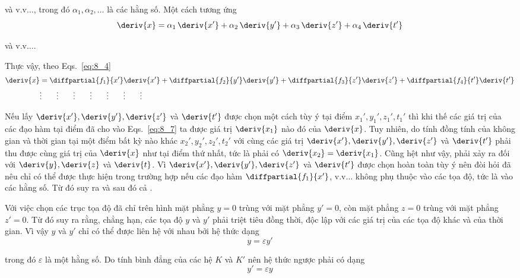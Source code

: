 \noindent
và v.v$\ldots$, trong đó $\alpha_1, \alpha_2, \ldots$ là các hằng số. Một cách tương ứng
\begin{equation}\label{eq:8_6}
	\deriv{x} = \alpha_1\,\deriv{x'} + \alpha_2\,\deriv{y'} + \alpha_3\,\deriv{z'} + \alpha_4\,\deriv{t'}
\end{equation}

\noindent
và v.v$\ldots$.

Thực vậy, theo Eqs.~\eqref{eq:8_4}
\begin{align}
	\deriv{x} &= \diffpartial{f_1}{x'}\deriv{x'} + \diffpartial{f_2}{y'}\deriv{y'} + \diffpartial{f_3}{z'}\deriv{z'} + \diffpartial{f_4}{t'}\deriv{t'}\label{eq:8_7}\\
	&\vdots\quad\quad\vdots\quad\quad\vdots\quad\quad\vdots\quad\quad\vdots\quad\quad\vdots\quad\quad\vdots\nonumber
\end{align}

\noindent
Nếu lấy $\deriv{x'}, \deriv{y'}, \deriv{z'}$ và $\deriv{t'}$ được chọn một cách tùy ý tại điểm $x_1', y_1', z_1', t_1'$ thì khi thế các giá trị của các đạo hàm tại điểm đã cho vào Eqs.~\eqref{eq:8_7} ta được giá trị $\deriv{x_1}$ nào đó của $\deriv{x}$. Tuy nhiên, do tính đồng tính của không gian và thời gian tại một điểm bất kỳ nào khác $x_2', y_2', z_2', t_2'$ với cùng các giá trị $\deriv{x'}, \deriv{y'}, \deriv{z'}$ và $\deriv{t'}$ phải thu được cùng giá trị của $\deriv{x}$ như tại điểm thứ nhất, tức là phải có $\deriv{x_2}=\deriv{x_1}$. Cũng hệt như vậy, phải xảy ra đối với $\deriv{y}, \deriv{z}$ và $\deriv{t}$. Vì $\deriv{x'}, \deriv{y'}, \deriv{z'}$ và $\deriv{t'}$ được chọn hoàn toàn tùy ý nên đòi hỏi đã nêu chỉ có thể được thực hiện trong trường hợp nếu các đạo hàm $\diffpartial{f_1}{x'}$, v.v$\ldots$ không phụ thuộc vào các tọa độ, tức là vào các hằng số. Từ đó suy ra  và sau đó cả .

Với việc chọn các trục tọa độ đã chỉ trên hình  mặt phẳng $y=0$ trùng với mặt phẳng $y'=0$, còn mặt phẳng $z=0$ trùng với mặt phẳng $z'=0$. Từ đó suy ra rằng, chẳng hạn, các tọa độ $y$ và $y'$ phải triệt tiêu đồng thời, độc lập với các giá trị của các tọa độ khác và của thời gian. Vì vậy $y$ và $y'$ chỉ có thể được liên hệ với nhau bởi hệ thức dạng
\begin{equation*}
	y = \varepsilon y'
\end{equation*}

\noindent
trong đó $\varepsilon$ là một hằng số. Do tính bình đẳng của các hệ $K$ và $K'$ nên hệ thức ngược phải có dạng
\begin{equation*}
	y' = \varepsilon y
\end{equation*}

